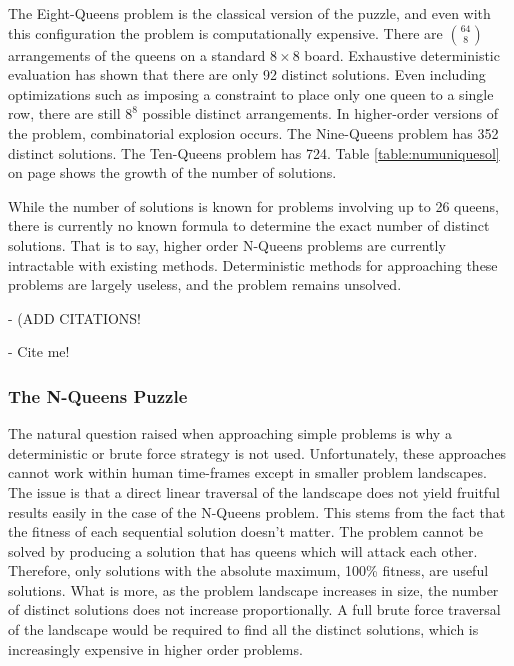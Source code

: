 \documentclass{sig-alternate}
\begin{document}
The Eight-Queens problem is the classical version of the puzzle, and even with this configuration the problem is computationally expensive. There are {$64 \choose 8$} arrangements of the queens on a standard {$8\times{}8$} board. Exhaustive deterministic evaluation has shown that there are only 92 distinct solutions. Even including optimizations such as imposing a constraint to place only one queen to a single row, there are still {$8^8$} possible distinct arrangements. In higher-order versions of the problem, combinatorial explosion occurs. The Nine-Queens problem has 352 distinct solutions. The Ten-Queens problem has 724. Table \ref{table:numuniquesol} on page \pageref{table:numuniquesol} shows the growth of the number of solutions. 

While the number of solutions is known for problems involving up to 26 queens, there is currently no known formula to determine the exact number of distinct solutions. That is to say, higher order N-Queens problems are currently intractable with existing methods. Deterministic methods for approaching these problems are largely useless, and the problem remains unsolved.

- (ADD CITATIONS!
  
- Cite me!\cite{crawford1992solving,homaifar1992e1,andrews2006investigation,tuson1998adapting, wolpert1997no,srinivas1994adaptive,goldberg1988genetic}

\subsubsection{The N-Queens Puzzle}
The natural question raised when approaching simple problems is why a deterministic or brute force strategy is not used. Unfortunately, these approaches cannot work within human time-frames except in smaller problem landscapes. The issue is that a direct linear traversal of the landscape does not yield fruitful results easily in the case of the N-Queens problem. This stems from the fact that the fitness of each sequential solution doesn't matter. The problem cannot be solved by producing a solution that has queens which will attack each other. Therefore, only solutions with the absolute maximum, 100\% fitness, are useful solutions. What is more, as the problem landscape increases in size, the number of distinct solutions does not increase proportionally. A full brute force traversal of the landscape would be required to find all the distinct solutions, which is increasingly expensive in higher order problems.
\end{document}

